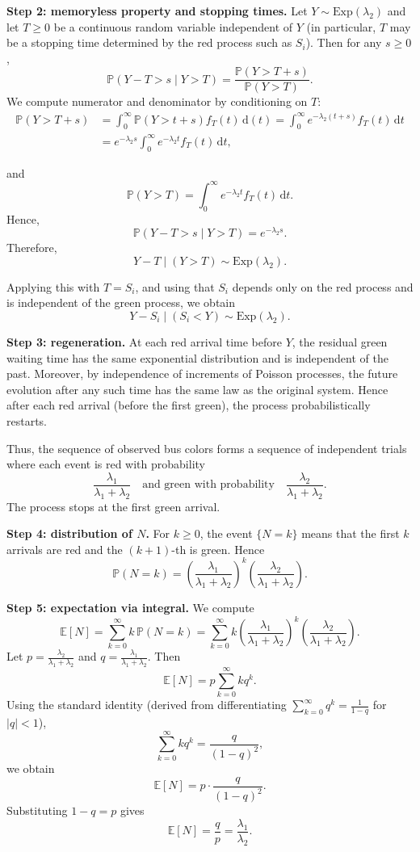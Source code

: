 \documentclass[a4paper,12pt]{article}
\begin{document}
\begin{itemize}
\medskip
\noindent
\textbf{Step 2: memoryless property and stopping times.}
Let $Y \sim \mathrm{Exp}(\lambda_2)$ and let $T \ge 0$ be a continuous random variable independent of $Y$ (in particular, $T$ may be a stopping time determined by the red process such as $S_i$). Then for any $s \ge 0$,
\[
\mathbb{P}(Y - T > s \mid Y > T)
= \frac{\mathbb{P}(Y > T+s)}{\mathbb{P}(Y > T)}.
\]
We compute numerator and denominator by conditioning on $T$:
\begin{align*}
	\mathbb{P}(Y > T+s)
&= \int_0^\infty \mathbb{P}(Y > t+s) f_T(t) \, \mathrm{d} (t)
= \int_0^\infty e^{-\lambda_2(t+s)} f_T(t) \, \mathrm{d} t 
\\ &= e^{-\lambda_2 s}\int_0^\infty e^{-\lambda_2 t} f_T(t)\, \mathrm{d} t,
\end{align*}

and
\[
\mathbb{P}(Y > T)
= \int_0^\infty e^{-\lambda_2 t} f_T(t)\, \mathrm{d} t.
\]
Hence,
\[
\mathbb{P}(Y - T > s \mid Y > T) = e^{-\lambda_2 s}.
\]
Therefore,
\[
Y - T \mid (Y > T) \sim \mathrm{Exp}(\lambda_2).
\]

Applying this with $T = S_i$, and using that $S_i$ depends only on the red process and is independent of the green process, we obtain
\[
Y - S_i \mid (S_i < Y) \sim \mathrm{Exp}(\lambda_2).
\]

\medskip
\noindent
\textbf{Step 3: regeneration.}
At each red arrival time before $Y$, the residual green waiting time has the same exponential distribution and is independent of the past. Moreover, by independence of increments of Poisson processes, the future evolution after any such time has the same law as the original system. Hence after each red arrival (before the first green), the process probabilistically restarts.

Thus, the sequence of observed bus colors forms a sequence of independent trials where each event is red with probability
\[
\frac{\lambda_1}{\lambda_1+\lambda_2}
\quad \text{and green with probability} \quad
\frac{\lambda_2}{\lambda_1+\lambda_2}.
\]
The process stops at the first green arrival.

\medskip
\noindent
\textbf{Step 4: distribution of $N$.}
For $k \ge 0$, the event $\{N = k\}$ means that the first $k$ arrivals are red and the $(k+1)$-th is green. Hence
\[
\mathbb{P}(N = k)
= \left(\frac{\lambda_1}{\lambda_1+\lambda_2}\right)^k
\left(\frac{\lambda_2}{\lambda_1+\lambda_2}\right).
\]

\medskip
\noindent
\textbf{Step 5: expectation via integral.}
We compute
\[
\mathbb{E}[N]
= \sum_{k=0}^\infty k \, \mathbb{P}(N=k)
= \sum_{k=0}^\infty k \left(\frac{\lambda_1}{\lambda_1+\lambda_2}\right)^k
\left(\frac{\lambda_2}{\lambda_1+\lambda_2}\right).
\]
Let $p = \frac{\lambda_2}{\lambda_1+\lambda_2}$ and $q = \frac{\lambda_1}{\lambda_1+\lambda_2}$. Then
\[
\mathbb{E}[N]
= p \sum_{k=0}^\infty k q^k.
\]
Using the standard identity (derived from differentiating $\sum_{k=0}^\infty q^k = \frac{1}{1-q}$ for $|q|<1$),
\[
\sum_{k=0}^\infty k q^k = \frac{q}{(1-q)^2},
\]
we obtain
\[
\mathbb{E}[N]
= p \cdot \frac{q}{(1-q)^2}.
\]
Substituting $1-q = p$ gives
\[
\mathbb{E}[N] = \frac{q}{p} = \frac{\lambda_1}{\lambda_2}.
\]


\end{itemize}
\end{document}
